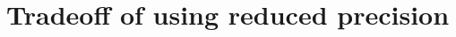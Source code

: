 

\section{Tradeoff of using reduced precision}
\begin{comment}
- Pros
* smaller chip size
* energy saving
* faster computation
* lower storage space
- Cons
* Risk for lower accuracy
* Often requires manual effort to implement/convert
* overhead from casting can be greater than performance benefit
* new data format often require new type of hardware
\end{comment}

